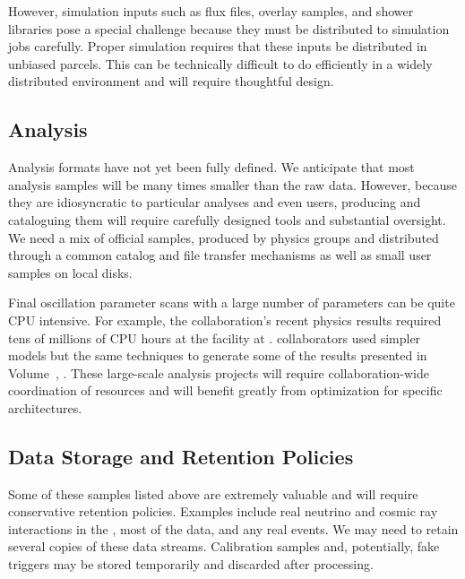 However, simulation inputs such as flux files, overlay samples, and shower libraries pose a special challenge because they must be distributed to simulation jobs carefully.   Proper simulation requires that these inputs be distributed in unbiased parcels.  This can be technically difficult to do efficiently in a widely distributed environment and will require thoughtful design. 

\subsection{Analysis}
\label{sec:exec-comp-anal}

Analysis formats have not yet been fully defined.  We anticipate that most analysis samples will be many times smaller than the raw data.  However, because they are idiosyncratic to particular analyses and even users,  producing and cataloguing them will require carefully designed tools and substantial oversight. 
We need a mix of official samples, produced by physics groups and distributed through a common catalog and file transfer mechanisms as well as small user samples on local disks. 

Final oscillation parameter scans with a large number of %
parameters can be quite CPU intensive.  For example, the  collaboration's recent physics results required tens of millions of  CPU hours at the  %
facility at .  collaborators used simpler models but the same techniques to generate some of the results presented in Volume~\volnumberphysics{}, \voltitlephysics{}. These large-scale analysis projects will require collaboration-wide coordination of resources and will benefit greatly from optimization for specific architectures.

\subsection{Data Storage and Retention Policies}
\label{sec:exec-comp-dsrp}

Some of these samples listed above are extremely valuable and will require conservative retention policies.   Examples include real neutrino and cosmic ray interactions in the , most of the  data, and any real  events.  We may need to retain several copies of these data streams. Calibration samples and, potentially, fake  triggers may be stored temporarily and discarded after processing. 

